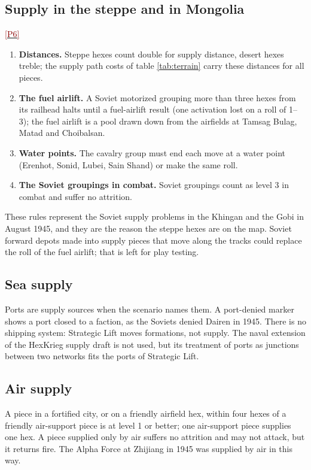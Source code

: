 \documentclass[11pt]{article}
\newcommand{\ptest}[1]{\hyperlink{ptest}{\textcolor{darkred}{[P#1]}}}
\begin{document}
\subsection{Supply in the steppe and in Mongolia}\label{sub:steppe-supply}
\ptest{6}
\begin{enumerate}
\item \textbf{Distances.} Steppe hexes count double for supply distance, desert hexes treble; the supply path costs of table \ref{tab:terrain} carry these distances for all pieces.
\item \textbf{The fuel airlift.} A Soviet motorized grouping more than three hexes from its railhead halts until a fuel-airlift result (one activation lost on a roll of 1--3); the fuel airlift is a pool drawn down from the airfields at Tamsag Bulag, Matad and Choibalsan.
\item \textbf{Water points.} The cavalry group must end each move at a water point (Erenhot, Sonid, Lubei, Sain Shand) or make the same roll.
\item \textbf{The Soviet groupings in combat.} Soviet groupings count as level 3 in combat and suffer no attrition.
\end{enumerate}
These rules represent the Soviet supply problems in the Khingan and the Gobi in August 1945, and they are the reason the steppe hexes are on the map. Soviet forward depots made into supply pieces that move along the tracks could replace the roll of the fuel airlift; that is left for play testing.

\subsection{Sea supply}\label{sub:sea-supply}
Ports are supply sources when the scenario names them. A port-denied marker shows a port closed to a faction, as the Soviets denied Dairen in 1945. There is no shipping system: Strategic Lift moves formations, not supply. The naval extension of the HexKrieg supply draft is not used, but its treatment of ports as junctions between two networks fits the ports of Strategic Lift.

\subsection{Air supply}\label{sub:air-supply}
A piece in a fortified city, or on a friendly airfield hex, within four hexes of a friendly air-support piece is at level 1 or better; one air-support piece supplies one hex. A piece supplied only by air suffers no attrition and may not attack, but it returns fire. The Alpha Force at Zhijiang in 1945 was supplied by air in this way.
\end{document}
